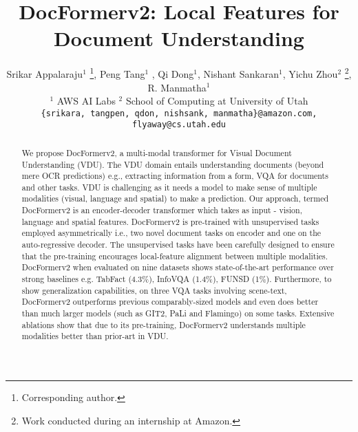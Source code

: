 \documentclass[10pt,twocolumn,letterpaper]{article}
\begin{document}
\title{DocFormerv2: Local Features for Document Understanding}

\author{Srikar Appalaraju$^{1}$ \thanks{Corresponding author.}, \quad Peng Tang$^{1}$ , \quad Qi Dong$^{1}$, \quad Nishant Sankaran$^{1}$, Yichu Zhou$^{2}$ \thanks{Work conducted during an internship at Amazon.}, \quad R. Manmatha$^{1}$ \\
$^{1}$ AWS AI Labs \quad
$^{2}$ School of Computing at University of Utah\\
{\tt\small \{srikara, tangpen, qdon, nishsank, manmatha\}@amazon.com, flyaway@cs.utah.edu}
}

\maketitle
\ificcvfinal\thispagestyle{empty}\fi


\newcommand{\xrightarrowdbl}[2][]{\leftarrow\mathrel{\mkern-14mu}\xrightarrow[#1]{#2}
}
\newcommand{\papertitle}{DocFormerv2 }
\newcommand{\papertitlenospace}{DocFormerv2}
\newcommand{\papertitleshort}{DFv2 }
\newcommand{\papertitleshortnospace}{DFv2}
\renewcommand\theadset{\def\arraystretch{.85}}


\begin{abstract}
   We propose \papertitlenospace, a multi-modal transformer for Visual Document Understanding (VDU). The VDU domain entails understanding documents (beyond mere OCR predictions) e.g., extracting information from a form, VQA for documents and other tasks. VDU is challenging as it needs a model to make sense of multiple modalities (visual, language and spatial) to make a prediction. Our approach, termed \papertitle is an encoder-decoder transformer which takes as input - vision, language and spatial features. \papertitle is pre-trained with unsupervised tasks employed asymmetrically i.e., two novel document tasks on encoder and one on the auto-regressive decoder. The unsupervised tasks have been carefully designed to ensure that the pre-training encourages local-feature alignment between multiple modalities. \papertitle when evaluated on nine  datasets shows state-of-the-art performance over strong baselines e.g. TabFact (4.3\%), InfoVQA (1.4\%), FUNSD (1\%). Furthermore, to show generalization capabilities, on three VQA tasks involving scene-text, \papertitle outperforms previous comparably-sized models and even does better than much larger models (such as GIT2, PaLi and Flamingo) on some tasks.
    Extensive ablations show that due to its pre-training, \papertitle understands multiple modalities better than prior-art in VDU.
\end{abstract}
\vspace{-2em}
\end{document}
